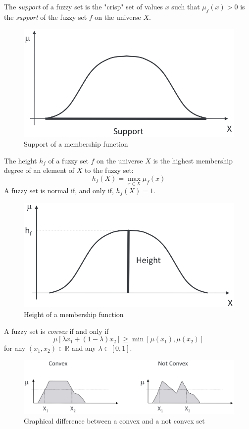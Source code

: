 \documentclass[12pt, a4paper]{report}
\begin{document}
    \begin{definition}[H]
        The \emph{support} of a fuzzy set is the "crisp" set of values $x$ such that $\mu_f(x)>0$ is the \emph{support} of the fuzzy set
        $f$ on the universe $X$.
    \end{definition}
    \begin{figure}[H]
        \centering
        \includegraphics[width=0.5\linewidth]{images/support.png}
        \caption{Support of a membership function}
    \end{figure}
    \begin{definition}
        The height $h_f$ of a fuzzy set $f$ on the universe $X$ is the highest membership degree of an element of $X$ to the fuzzy set:
        \[h_f(X)=\max_{x \in X}\mu_f(x)\]
        A fuzzy set is normal if, and only if, $h_f(X)=1$.
    \end{definition}
    \begin{figure}[H]
        \centering
        \includegraphics[width=0.5\linewidth]{images/height.png}
        \caption{Height of a membership function}
    \end{figure}
    \begin{definition}
        A fuzzy set is \emph{convex} if and only if 
        \[\mu[\lambda x_1+(1-\lambda)x_2] \geq \min [\mu(x_1),\mu(x_2)]\]
        for any $(x_1,x_2) \in \mathbb{R}$ and any $\lambda \in [0,1]$.
    \end{definition}
    \begin{figure}[H]
        \centering
        \includegraphics[width=0.75\linewidth]{images/convex.png}
        \caption{Graphical difference between a convex and a not convex set}
    \end{figure}
\end{document}

